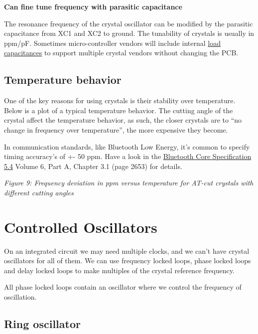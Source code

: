 \textbf{Can fine tune frequency with parasitic capacitance}

The resonance frequency of the crystal oscillator can be modified by the
parasitic capacitance from XC1 and XC2 to ground. The tunability of
crystals is usually in ppm/pF. Sometimes micro-controller vendors will
include internal
\href{https://infocenter.nordicsemi.com/topic/ps_nrf5340/chapters/oscillators/doc/oscillators.html?cp=4_0_0_3_11_0_0\#concept_internal_caps}{load
capacitances} to support multiple crystal vendors without changing the
PCB.

\subsection{Temperature behavior}\label{temperature-behavior}

One of the key reasons for using crystals is their stability over
temperature. Below is a plot of a typical temperature behavior. The
cutting angle of the crystal affect the temperature behavior, as such,
the closer crystals are to ``no change in frequency over temperature'',
the more expensive they become.

In communication standards, like Bluetooth Low Energy, it's common to
specify timing accuracy's of +- 50 ppm. Have a look in the
\href{https://www.bluetooth.org/DocMan/handlers/DownloadDoc.ashx?doc_id=556599}{Bluetooth
Core Specification 5.4} Volume 6, Part A, Chapter 3.1 (page 2653) for
details.


{
\centering
{}
}

\emph{Figure 9: Frequency deviation in ppm versus temperature for AT-cut
crystals with different cutting angles}

\section{Controlled Oscillators}\label{controlled-oscillators}

On an integrated circuit we may need multiple clocks, and we can't have
crystal oscillators for all of them. We can use frequency locked loops,
phase locked loops and delay locked loops to make multiples of the
crystal reference frequency.

All phase locked loops contain an oscillator where we control the
frequency of oscillation.

\subsection{Ring oscillator}\label{ring-oscillator}

